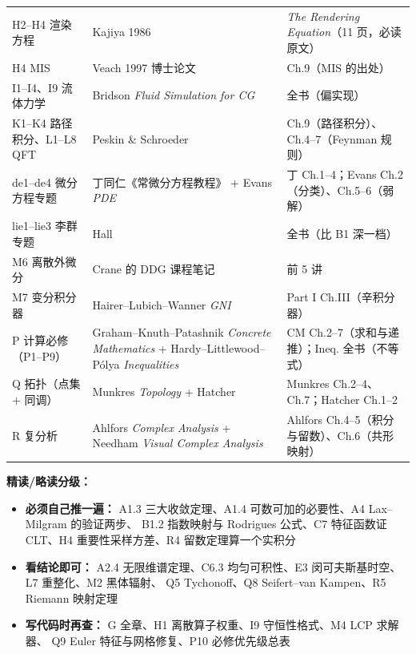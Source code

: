\begin{center}
\begin{tabular}{L{3.9cm}L{5.2cm}L{5.5cm}}
H2--H4 渲染方程 & Kajiya 1986 & \emph{The Rendering Equation}（11 页，必读原文） \\
H4 MIS & Veach 1997 博士论文 & Ch.9（MIS 的出处） \\
I1--I4、I9 流体力学 & Bridson \emph{Fluid Simulation for CG} & 全书（偏实现） \\
K1--K4 路径积分、L1--L8 QFT & Peskin \& Schroeder & Ch.9（路径积分）、Ch.4--7（Feynman 规则） \\
de1--de4 微分方程专题 & 丁同仁《常微分方程教程》 + Evans \emph{PDE} & 丁 Ch.1--4；Evans Ch.2（分类）、Ch.5--6（弱解） \\
lie1--lie3 李群专题 & Hall & 全书（比 B1 深一档） \\
M6 离散外微分 & Crane 的 DDG 课程笔记 & 前 5 讲 \\
M7 变分积分器 & Hairer--Lubich--Wanner \emph{GNI} & Part I Ch.III（辛积分器） \\
P 计算必修（P1--P9） & Graham--Knuth--Patashnik \emph{Concrete Mathematics} + Hardy--Littlewood--Pólya \emph{Inequalities} & CM Ch.2--7（求和与递推）；Ineq. 全书（不等式） \\
Q 拓扑（点集 $+$ 同调） & Munkres \emph{Topology} + Hatcher & Munkres Ch.2--4、Ch.7；Hatcher Ch.1--2 \\
R 复分析 & Ahlfors \emph{Complex Analysis} + Needham \emph{Visual Complex Analysis} & Ahlfors Ch.4--5（积分与留数）、Ch.6（共形映射） \\
\bottomrule
\end{tabular}
\end{center}

\textbf{精读/略读分级：}
\begin{itemize}
  \item \textbf{必须自己推一遍：} A1.3 三大收敛定理、A1.4 可数可加的必要性、A4 Lax--Milgram 的验证两步、
        B1.2 指数映射与 Rodrigues 公式、C7 特征函数证 CLT、H4 重要性采样方差、R4 留数定理算一个实积分
  \item \textbf{看结论即可：} A2.4 无限维谱定理、C6.3 均匀可积性、E3 闵可夫斯基时空、L7 重整化、M2 黑体辐射、
        Q5 Tychonoff、Q8 Seifert--van Kampen、R5 Riemann 映射定理
  \item \textbf{写代码时再查：} G 全章、H1 离散算子权重、I9 守恒性格式、M4 LCP 求解器、
        Q9 Euler 特征与网格修复、P10 必修优先级总表
\end{itemize}